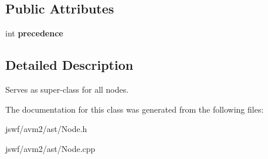 \subsection*{Public Attributes}
\begin{DoxyCompactItemize}
\item 
\hypertarget{classjswf_1_1avm2_1_1ast_1_1_node_a2c3c6d68bbd9448af7aeb068c51a3309}{int {\bfseries precedence}}\label{classjswf_1_1avm2_1_1ast_1_1_node_a2c3c6d68bbd9448af7aeb068c51a3309}

\end{DoxyCompactItemize}


\subsection{Detailed Description}
Serves as super-\/class for all nodes. 

The documentation for this class was generated from the following files\+:\begin{DoxyCompactItemize}
\item 
jswf/avm2/ast/Node.\+h\item 
jswf/avm2/ast/Node.\+cpp\end{DoxyCompactItemize}
